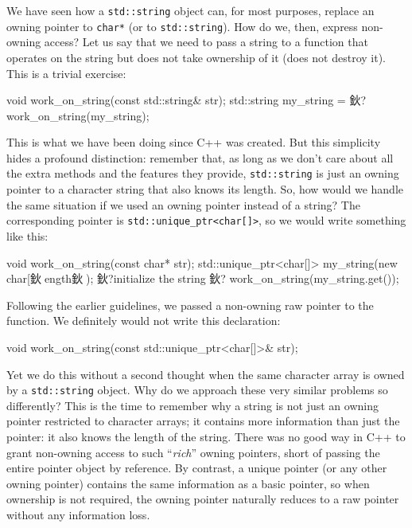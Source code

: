 We have seen how a \texttt{std::string} object can, for most purposes, replace an owning pointer to \texttt{char*} (or to \texttt{std::string}). How do we, then, express non-owning access? Let us say that we need to pass a string to a function that operates on the string but does not take ownership of it (does not destroy it). This is a trivial exercise:

\begin{code}
void work_on_string(const std::string& str);
std::string my_string = 鈥?
work_on_string(my_string);
\end{code}

This is what we have been doing since C++ was created. But this simplicity hides a profound distinction: remember that, as long as we don't care about all the extra methods and the features they provide, \texttt{std::string} is just an owning pointer to a character string that also knows its length. So, how would we handle the same situation if we used an owning pointer instead of a string? The corresponding pointer is \texttt{std::unique\_ptr\textless{}char{[}{]}\textgreater{}}, so we would write something like this:

\begin{code}
void work_on_string(const char* str);
std::unique_ptr<char[]> my_string(new char[鈥ength鈥);
鈥?initialize the string 鈥?
work_on_string(my_string.get());
\end{code}

Following the earlier guidelines, we passed a non-owning raw pointer to the function. We definitely would not write this declaration:

\begin{code}
void work_on_string(const std::unique_ptr<char[]>& str);
\end{code}

Yet we do this without a second thought when the same character array is owned by a \texttt{std::string} object. Why do we approach these very similar problems so differently? This is the time to remember why a string is not just an owning pointer restricted to character arrays; it contains more information than just the pointer: it also knows the length of the string. There was no good way in C++ to grant non-owning access to such ``\emph{rich}'' owning pointers, short of passing the entire pointer object by reference. By contrast, a unique pointer (or any other owning pointer) contains the same information as a basic pointer, so when ownership is not required, the owning pointer naturally reduces to a raw pointer without any information loss.


